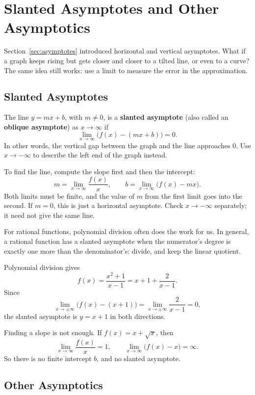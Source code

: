 \section{Slanted Asymptotes and Other Asymptotics}
\label{sec:slanted-asymptotes}

Section~\ref{sec:asymptotes} introduced horizontal and vertical asymptotes.
What if a graph keeps rising but gets closer and closer to a tilted line,
or even to a curve? The same idea still works: use a limit to measure the
error in the approximation.

\subsection{Slanted Asymptotes}

The line $y=mx+b$, with $m\ne0$, is a \textbf{slanted asymptote}
(also called an \textbf{oblique asymptote}) as $x\to\infty$ if
$$\lim_{x\to\infty}\bigl(f(x)-(mx+b)\bigr)=0.$$
In other words, the vertical gap between the graph and the line approaches
0. Use $x\to-\infty$ to describe the left end of the graph instead.

To find the line, compute the slope first and then the intercept:
$$m=\lim_{x\to\infty}\frac{f(x)}{x},\qquad
b=\lim_{x\to\infty}\bigl(f(x)-mx\bigr).$$
Both limits must be finite, and the value of $m$ from the first limit
goes into the second. If $m=0$, this is just a horizontal asymptote.
Check $x\to-\infty$ separately; it need not give the same line.

For rational functions, polynomial division often does the work for us.
In general, a rational function has a slanted asymptote when the
numerator's degree is exactly one more than the denominator's: divide,
and keep the linear quotient.
\begin{exampleblock}
Polynomial division gives
$$f(x)=\frac{x^2+1}{x-1}=x+1+\frac{2}{x-1}.$$
Since
$$\lim_{x\to\pm\infty}\bigl(f(x)-(x+1)\bigr)
=\lim_{x\to\pm\infty}\frac{2}{x-1}=0,$$
the slanted asymptote is $y=x+1$ in both directions.
\end{exampleblock}

\begin{exampleblock}
Finding a slope is not enough. If $f(x)=x+\sqrt{x}$, then
$$\lim_{x\to\infty}\frac{f(x)}x=1,\qquad
\lim_{x\to\infty}\bigl(f(x)-x\bigr)=\infty.$$
So there is no finite intercept $b$, and no slanted asymptote.
\end{exampleblock}

\subsection{Other Asymptotics}

